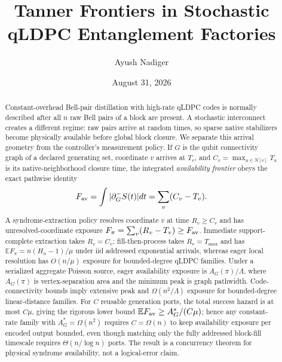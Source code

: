 \documentclass[aps,prx,reprint,superscriptaddress,nofootinbib,longbibliography,floatfix]{revtex4-2}
\newcommand{\E}{\mathbb E}\newcommand{\Prob}{\mathbb P}
\begin{document}
\title{Tanner Frontiers in Stochastic qLDPC Entanglement Factories}
\author{Ayush Nadiger}
\date{August 31, 2026}

\begin{abstract}
Constant-overhead Bell-pair distillation with high-rate qLDPC codes is normally described after all $n$ raw Bell pairs of a block are present. A stochastic interconnect creates a different regime: raw pairs arrive at random times, so sparse native stabilizers become physically available before global block closure. We separate this arrival geometry from the controller's measurement policy. If $G$ is the qubit connectivity graph of a declared generating set, coordinate $v$ arrives at $T_v$, and $C_v=\max_{u\in N[v]}T_u$ is its native-neighborhood closure time, the integrated \emph{availability frontier} obeys the exact pathwise identity
\begin{equation*}
F_{\rm av}=\int |\partial_G^-S(t)|dt=\sum_v(C_v-T_v).
\end{equation*}
A syndrome-extraction policy resolves coordinate $v$ at time $R_v\ge C_v$ and has unresolved-coordinate exposure $F_\pi=\sum_v(R_v-T_v)\ge F_{\rm av}$. Immediate support-complete extraction takes $R_v=C_v$; fill-then-process takes $R_v=T_{\max}$ and has $\E F_\pi=n(H_n-1)/\mu$ under iid addressed exponential arrivals, whereas eager local resolution has $O(n/\mu)$ exposure for bounded-degree qLDPC families. Under a serialized aggregate Poisson source, eager availability exposure is $A_G(\pi)/\Lambda$, where $A_G(\pi)$ is vertex-separation area and the minimum peak is graph pathwidth. Code-connectivity bounds imply extensive peak and $\Omega(n^2/\Lambda)$ exposure for bounded-degree linear-distance families. For $C$ reusable generation ports, the total success hazard is at most $C\mu$, giving the rigorous lower bound $\E F_{\rm av}\ge A_G^*/(C\mu)$; hence any constant-rate family with $A_G^*=\Omega(n^2)$ requires $C=\Omega(n)$ to keep availability exposure per encoded output bounded, even though matching only the fully addressed block-fill timescale requires $\Theta(n/\log n)$ ports. The result is a concurrency theorem for physical syndrome availability, not a logical-error claim.
\end{abstract}
\maketitle
\end{document}
